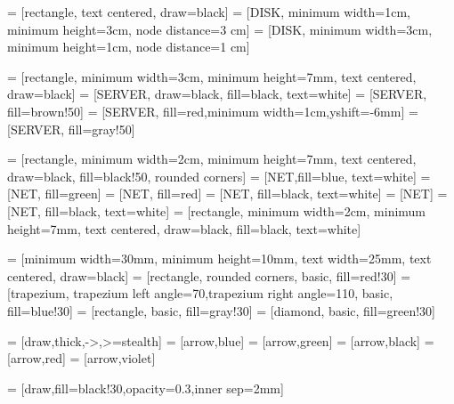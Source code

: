 \usepackage{tikz}
\usetikzlibrary{shapes.geometric,arrows,fit,backgrounds,positioning,calc}

\geometry{
	a2paper,
	portrait,
	left=20mm,
	right=20mm,
	top=20mm,
	headheight=25mm,
	bottom=30mm,
	bindingoffset=0mm
}

 = [rectangle, text centered, draw=black]
 = [DISK, minimum width=1cm, minimum height=3cm, node distance=3 cm]
 = [DISK, minimum width=3cm, minimum height=1cm, node distance=1 cm]

 = [rectangle, minimum width=3cm, minimum height=7mm, text centered, draw=black]
 = [SERVER, draw=black, fill=black, text=white]
 = [SERVER, fill=brown!50]
 = [SERVER, fill=red,minimum width=1cm,yshift=-6mm]
 = [SERVER, fill=gray!50]

 = [rectangle, minimum width=2cm, minimum height=7mm, text centered, draw=black, fill=black!50, rounded corners]
 = [NET,fill=blue, text=white]
 = [NET, fill=green]
 = [NET, fill=red]
 = [NET, fill=black, text=white]
 = [NET]
 = [NET, fill=black, text=white]
 = [rectangle, minimum width=2cm, minimum height=7mm, text centered, draw=black, fill=black, text=white]

 = [minimum width=30mm, minimum height=10mm, text width=25mm, text centered, draw=black]
 = [rectangle, rounded corners, basic, fill=red!30]
 =[trapezium, trapezium left angle=70,trapezium right angle=110, basic, fill=blue!30]
 = [rectangle, basic, fill=gray!30]
 = [diamond, basic, fill=green!30]

 = [draw,thick,->,>=stealth]
 = 	[arrow,blue]
 =	[arrow,green]
 = 		[arrow,black]
 = 	[arrow,red]
 = 	[arrow,violet]

 = [draw,fill=black!30,opacity=0.3,inner sep=2mm]
